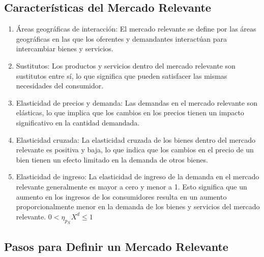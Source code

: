 \documentclass[
  a4paper,
]{article}
\begin{document}
\hypertarget{caracteruxedsticas-del-mercado-relevante}{%
\subsection{Características del Mercado
Relevante}\label{caracteruxedsticas-del-mercado-relevante}}

\begin{enumerate}
\def\labelenumi{\arabic{enumi}.}
\item
  Áreas geográficas de interacción: El mercado relevante se define por
  las áreas geográficas en las que los oferentes y demandantes
  interactúan para intercambiar bienes y servicios.
\item
  Sustitutos: Los productos y servicios dentro del mercado relevante son
  sustitutos entre sí, lo que significa que pueden satisfacer las mismas
  necesidades del consumidor.
\item
  Elasticidad de precios y demanda: Las demandas en el mercado relevante
  son elásticas, lo que implica que los cambios en los precios tienen un
  impacto significativo en la cantidad demandada.
\item
  Elasticidad cruzada: La elasticidad cruzada de los bienes dentro del
  mercado relevante es positiva y baja, lo que indica que los cambios en
  el precio de un bien tienen un efecto limitado en la demanda de otros
  bienes.
\item
  Elasticidad de ingreso: La elasticidad de ingreso de la demanda en el
  mercado relevante generalmente es mayor a cero y menor a 1. Esto
  significa que un aumento en los ingresos de los consumidores resulta
  en un aumento proporcionalmente menor en la demanda de los bienes y
  servicios del mercado relevante. \(0 < \eta_{p_{X}} X^d \leq 1\)
\end{enumerate}

\hypertarget{pasos-para-definir-un-mercado-relevante}{%
\subsection{Pasos para Definir un Mercado
Relevante}\label{pasos-para-definir-un-mercado-relevante}}
\end{document}
